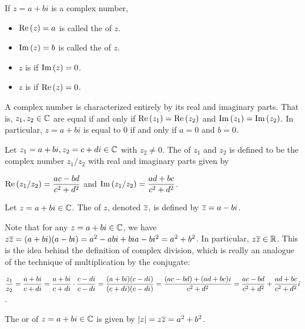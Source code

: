\documentclass[11pt,fleqn,dvipsnames,usenames]{article}
\newcommand{\p}{\noindent}
\begin{document}
\begin{definition}
If $z = a + bi$ is a complex number,
\begin{itemize}
\item $\text{Re}\left(z\right) = a$ is called the  of $z$.
\item $\text{Im}\left(z\right) = b$ is called the  of $z$. 
\item $z$ is  if $\text{Im}\left(z\right) = 0$.
\item $z$ is  if $\text{Re}\left(z\right) = 0$.
\end{itemize}
\end{definition}

\note A complex number is characterized entirely by its real and imaginary parts.  That is, $z_{1},z_{2}\in\mathbb{C}$ are equal if and only if $\text{Re}\left(z_{1}\right) = \text{Re}\left(z_{2}\right)$ and $\text{Im}\left(z_{1}\right) = \text{Im}\left(z_{2}\right)$.  In particular, $z = a + bi$ is equal to $0$ if and only if $a = 0$ and $b = 0$.

\begin{definition}
Let $z_{1} = a+bi,z_{2} = c+di\in\mathbb{C}$ with $z_{2}\neq 0$.  The  of $z_{1}$ and $z_{2}$ is defined to be the complex number $z_{1}/z_{2}$ with real and imaginary parts given by
\begin{center}
$\text{Re}\left(z_{1}/z_{2}\right) = \dfrac{ac - bd}{c^2 + d^2}$ and $\text{Im}\left(z_{1}/z_{2}\right) = \dfrac{ad + bc}{c^2 + d^2}$.
\end{center}
\end{definition}

\begin{definition}
Let $z = a + bi\in\mathbb{C}$.  The  of $z$, denoted $\overline{z}$, is defined by $\overline{z} = a - bi$.
\end{definition}
\vsp

\p Note that for any $z = a + bi\in\mathbb{C}$, we have $z\overline{z} = (a + bi)(a - bi) = a^2 - abi + bia - bi^2 = a^2 + b^2$.  In particular, $z\overline{z}\in\mathbb{R}$.  This is the idea behind the definition of complex division, which is really an analogue of the technique of {multiplication by the conjugate}:

\begin{center}
$\displaystyle{\frac{z_{1}}{z_{2}} = \frac{a + bi}{c + di} = \frac{a + bi}{c + di}\cdot \frac{c - di}{c - di} = \frac{(a + bi)(c - di)}{(c + di)(c - di)} = \frac{(ac - bd) + (ad + bc)i}{c^2 + d^2} = \frac{ac - bd}{c^2 + d^2} + \frac{ad + bc}{c^2 + d^2}i}$.
\end{center}

\begin{definition}
The  or  of $z = a+bi\in\mathbb{C}$ is given by $|z| = z\overline{z} = a^2 + b^2$.
\end{definition}
\end{document}
